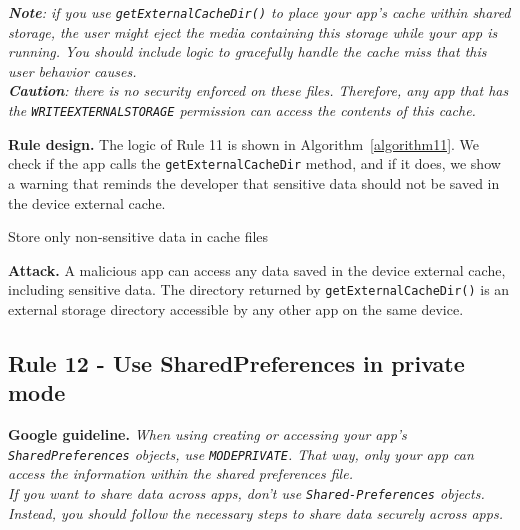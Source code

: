 \emph{\textbf{Note}: if you use \texttt{getExternalCacheDir()} to place your app's cache within shared storage, the user might eject the media containing this storage while your app is running. You should include logic to gracefully handle the cache miss that this user behavior causes.
\\
\textbf{Caution}: there is no security enforced on these files. Therefore, any app that has the \texttt{WRITE\textunderscore EXTERNAL\textunderscore STORAGE} permission can access the contents of this cache.}

\textbf{Rule design.} The logic of Rule 11 is shown in Algorithm~\ref{algorithm11}. We check if the app calls the \texttt{getExternalCacheDir} method, and if it does, we show a warning that reminds the developer that sensitive data should not be saved in the device external cache. 

\setcounter{algocf}{10}
\begin{algorithm}[]
\SetAlgoLined
{}
\caption{Store only non-sensitive data in cache files}
\label{algorithm11}
\end{algorithm}

\textbf{Attack.} A malicious app can access any data saved in the device external cache, including sensitive data. The directory returned by \texttt{getExternalCacheDir()} is an external storage directory accessible by any other app on the same device.

\subsection{Rule 12 - Use SharedPreferences in private mode} 
\textbf{Google guideline.} \emph{When using creating or accessing your app's \texttt{SharedPreferences} objects, use \texttt{MODE\textunderscore PRIVATE}. That way, only your app can access the information within the shared preferences file.}
\\
\textit{If you want to share data across apps, don't use \texttt{Shared-\allowbreak Preferences} objects. Instead, you should follow the necessary steps to share data securely across apps.}

